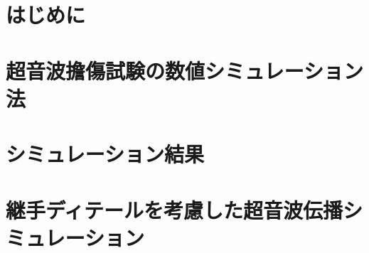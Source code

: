﻿\documentclass[11pt,a4j]{mybook2}
\begin{document}
\chapter{はじめに}
	
\chapter{超音波擔傷試験の数値シミュレーション法}
	
\chapter{シミュレーション結果}
	
\chapter{継手ディテールを考慮した超音波伝播シミュレーション}
	
\end{document}
